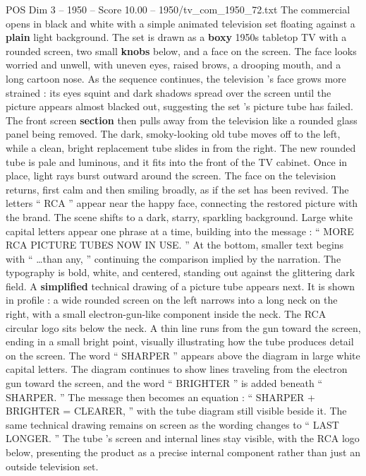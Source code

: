 \begin{textsample}{POS Dim 3 – 1950 – Score 10.00 – 1950/tv\_com\_1950\_72.txt}  \label{ex:f3_pos_019}
The commercial opens in black and white with a simple animated television set floating against a \textbf{plain} light background.
The set is drawn as a \textbf{boxy} 1950s tabletop TV with a rounded screen, two small \textbf{knobs} below, and a face on the screen.
The face looks worried and unwell, with uneven eyes, raised brows, a drooping mouth, and a long cartoon nose.
As the sequence continues, the television ’s face grows more strained : its eyes squint and dark shadows spread over the screen until the picture appears almost blacked out, suggesting the set ’s picture tube has failed.
The front screen \textbf{section} then pulls away from the television like a rounded glass panel being removed.
The dark, smoky-looking old tube moves off to the left, while a clean, bright replacement tube slides in from the right.
The new rounded tube is pale and luminous, and it fits into the front of the TV cabinet.
Once in place, light rays burst outward around the screen.
The face on the television returns, first calm and then smiling broadly, as if the set has been revived.
The letters “ RCA ” appear near the happy face, connecting the restored picture with the brand.
The scene shifts to a dark, starry, sparkling background.
Large white capital letters appear one phrase at a time, building into the message : “ MORE RCA PICTURE TUBES NOW IN USE. ” At the bottom, smaller text begins with “ …than any, ” continuing the comparison implied by the narration.
The typography is bold, white, and centered, standing out against the glittering dark field.
A \textbf{simplified} technical drawing of a picture tube appears next.
It is shown in profile : a wide rounded screen on the left narrows into a long neck on the right, with a small electron-gun-like component inside the neck.
The RCA circular logo sits below the neck.
A thin line runs from the gun toward the screen, ending in a small bright point, visually illustrating how the tube produces detail on the screen.
The word “ SHARPER ” appears above the diagram in large white capital letters.
The diagram continues to show lines traveling from the electron gun toward the screen, and the word “ BRIGHTER ” is added beneath “ SHARPER. ” The message then becomes an equation : “ SHARPER + BRIGHTER = CLEARER, ” with the tube diagram still visible beside it.
The same technical drawing remains on screen as the wording changes to “ LAST LONGER. ” The tube ’s screen and internal lines stay visible, with the RCA logo below, presenting the product as a precise internal component rather than just an outside television set.

\end{textsample}
